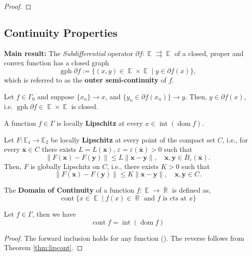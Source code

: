 \documentclass{tufte-handout}
\DeclareMathOperator{\dom}{dom}
\DeclareMathOperator{\R}{\mathbb{R}}
\DeclareMathOperator{\E}{\mathbb{E}}
\DeclareMathOperator{\cont}{cont}
\begin{document}
{{\begin{theorem}
\begin{proof}
  \end{proof}
\end{theorem}
\subsection{Continuity Properties}%
  \label{sub:Continuity Properties}
  \textbf{Main result:} The \textit{Subdifferential} operator $\partial f : \E\rightrightarrows \E$ of a closed, proper and convex function has a closed graph 
  $$\operatorname{gph} \partial f := \{ (x,y) \in \E \times \E \mid y \in \partial f(x) \},$$
  which is referred to as the \textbf{outer semi-continuity } of $f.$
  \begin{corollary} Let $f \in \Gamma_0$  and suppose $\{ x_n \}\to x $, and $\{y_n \in \partial f(x_n)\}\to y$. Then, $y \in \partial f(x)$, i.e. $\operatorname{gph}\partial f \in \E \times \E $ is closed. 
  \end{corollary}
  \begin{theorem}\label{thm:lipcont}
    A function $f \in \Gamma$ is locally \textbf{Lipschitz} at every $x \in \operatorname{int}(\dom f).$ 
  \end{theorem}
  \begin{proposition} 
    Let $F: \mathbb{E}_{1} \rightarrow \mathbb{E}_{2}$ be locally \textbf{Lipschitz} at every point of the compact set $C$, i.e., for every $\overline{\boldsymbol{x}} \in C$ there exists $L=L(\overline{\boldsymbol{x}})$, $\varepsilon=\varepsilon(\overline{\boldsymbol{x}})>0$ such that
$$
\|F(\boldsymbol{x})-F(\boldsymbol{y})\| \leq L\|\boldsymbol{x}-\boldsymbol{y}\|, \quad \boldsymbol{x}, \boldsymbol{y} \in B_{\varepsilon}(\overline{\boldsymbol{x}}) .
$$
Then, $F$ is globally Lipschitz on $C$, i.e., there exists $K>0$ such that
$$
\|F(\boldsymbol{x})-F(\boldsymbol{y})\| \leq K\|\boldsymbol{x}-\boldsymbol{y}\|, \quad \boldsymbol{x}, \boldsymbol{y} \in C .
$$
  \end{proposition}
\begin{definition}
  The \textbf{Domain of Continuity} of a function $f : \E \to \overline{\R}$ is defined as, 
  $$\cont \{x \in \E\mid f(x) \in \R \text{ and $f$ is cts at $x$}\}$$
\end{definition}
\begin{corollary}
  Let $f\in \Gamma$, then we have 
  $$ \cont f = \operatorname{int} (\dom f) $$
  \begin{proof} 
    The forward inclusion holds for any function (). The reverse follows from Theorem \ref{thm:lipcont}.

\end{proof}
\end{corollary}}}
\end{document}
